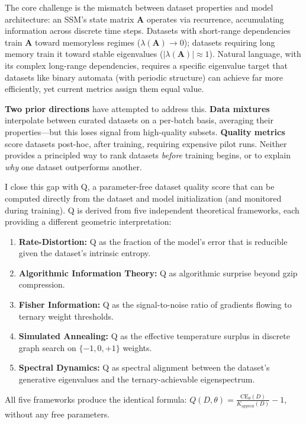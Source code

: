 \documentclass{article}
\begin{document}
The core challenge is the mismatch between dataset properties and model architecture: an SSM's state matrix $\mathbf{A}$ operates via recurrence, accumulating information across discrete time steps. Datasets with short-range dependencies train $\mathbf{A}$ toward memoryless regimes ($\lambda(\mathbf{A}) \to 0$); datasets requiring long memory train it toward stable eigenvalues ($|\lambda(\mathbf{A})| \approx 1$). Natural language, with its complex long-range dependencies, requires a specific eigenvalue target that datasets like binary automata (with periodic structure) can achieve far more efficiently, yet current metrics assign them equal value.

\textbf{Two prior directions} have attempted to address this. \textbf{Data mixtures} interpolate between curated datasets on a per-batch basis, averaging their properties---but this loses signal from high-quality subsets. \textbf{Quality metrics} score datasets post-hoc, after training, requiring expensive pilot runs. Neither provides a principled way to rank datasets \emph{before} training begins, or to explain \emph{why} one dataset outperforms another.

I close this gap with Q, a parameter-free dataset quality score that can be computed directly from the dataset and model initialization (and monitored during training). Q is derived from five independent theoretical frameworks, each providing a different geometric interpretation:
\begin{enumerate}
  \item \textbf{Rate-Distortion:} Q as the fraction of the model's error that is reducible given the dataset's intrinsic entropy.
  \item \textbf{Algorithmic Information Theory:} Q as algorithmic surprise beyond gzip compression.
  \item \textbf{Fisher Information:} Q as the signal-to-noise ratio of gradients flowing to ternary weight thresholds.
  \item \textbf{Simulated Annealing:} Q as the effective temperature surplus in discrete graph search on $\{-1, 0, +1\}$ weights.
  \item \textbf{Spectral Dynamics:} Q as spectral alignment between the dataset's generative eigenvalues and the ternary-achievable eigenspectrum.
\end{enumerate}

All five frameworks produce the identical formula: $Q(D, \theta) = \frac{\mathrm{CE}_\theta(D)}{K_{\mathrm{approx}}(D)} - 1$, without any free parameters.
\end{document}
